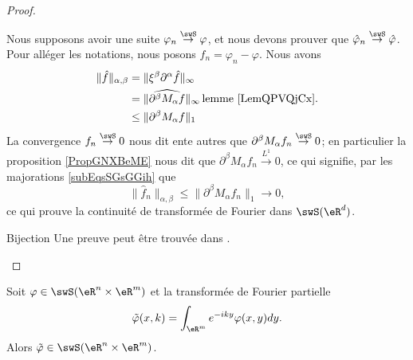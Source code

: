 \begin{proof}
\begin{subproof}
            Nous supposons avoir une suite \( \varphi_n\stackrel{\swS}{\to}\varphi\), et nous devons prouver que \( \hat\varphi_n\stackrel{\swS}{\to}\hat\varphi\). Pour alléger les notations, nous posons \( f_n=\varphi_n-\varphi\). Nous avons
            \begin{subequations}    \label{subEqsSGsGGih}
                \begin{align}
                    \| \hat f \|_{\alpha,\beta}&=\| \xi^{\beta}\partial^{\alpha}\hat f \|_{\infty}\\
                    &=\| \widehat{  \partial^{\beta}M_{\alpha}f  } \|_{\infty}\,\text{lemme \ref{LemQPVQjCx}.}\\
                    &\leq \| \partial^{\beta}M_{\alpha}f \|_1
                \end{align}
            \end{subequations}
            La convergence \(f_n\stackrel{\swS}{\to}0\) nous dit ente autres que \( \partial^{\beta}M_{\alpha}f_n\stackrel{\swS}{\to}0\); en particulier la proposition \ref{PropGNXBeME} nous dit que \( \partial^{\beta}M_{\alpha}f_n\stackrel{L^1}{\to}0\), ce qui signifie, par les majorations \eqref{subEqsSGsGGih} que
            \begin{equation}
                \| \hat f_n \|_{\alpha,\beta}\leq \| \partial^{\beta}M_{\alpha}f_n \|_1\to0,
            \end{equation}
            ce qui prouve la continuité de transformée de Fourier dans \( \swS(\eR^d)\).
        \item[Bijection]
            Une preuve peut être trouvée dans \cite{BMoNzTY}.
    \end{subproof}
\end{proof}

\begin{proposition}     \label{PROPooMVQMooGYAzSX}
    Soit \( \varphi\in\swS(\eR^n\times \eR^m)\) et la transformée de Fourier partielle
    \begin{equation}
        \tilde \varphi(x,k)=\int_{\eR^m}  e^{-iky}\varphi(x,y)dy.
    \end{equation}
    Alors \( \tilde \varphi\in\swS(\eR^n\times \eR^m  )\).
\end{proposition}

